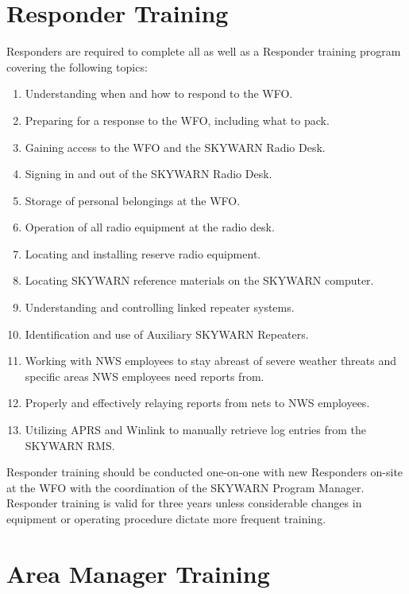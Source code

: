\documentclass[pdflatex,letterpaper,twoside,12pt]{book}
\begin{document}

\section{Responder Training}

Responders are required to complete all  as well as a Responder training program covering the following topics:

\begin{enumerate}
\item Understanding when and how to respond to the WFO.
\item Preparing for a response to the WFO, including what to pack.
\item Gaining access to the WFO and the SKYWARN Radio Desk.
\item Signing in and out of the SKYWARN Radio Desk.
\item Storage of personal belongings at the WFO.
\item Operation of all radio equipment at the radio desk.
\item Locating and installing reserve radio equipment.
\item Locating SKYWARN reference materials on the SKYWARN computer.
\item Understanding and controlling linked repeater systems.
\item Identification and use of Auxiliary SKYWARN Repeaters.
\item Working with NWS employees to stay abreast of severe weather threats and specific areas NWS employees need reports from.
\item Properly and effectively relaying reports from nets to NWS employees.
\item Utilizing APRS and Winlink to manually retrieve log entries from the SKYWARN RMS.
\end{enumerate}

Responder training should be conducted one-on-one with new Responders on-site at the WFO with the coordination of the SKYWARN Program Manager.  Responder training is valid for three years unless considerable changes in equipment or operating procedure dictate more frequent training.


\section{Area Manager Training}
\end{document}
